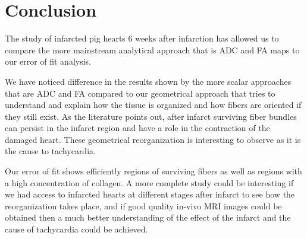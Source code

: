 \chapter{Conclusion}

The study of infarcted pig hearts 6 weeks after infarction has allowed us to compare the more mainstream analytical approach that is ADC and FA maps to our error of fit analysis.

We have noticed difference in the results shown by the more scalar approaches that are ADC and FA compared to our geometrical approach that tries to understand and explain how the tissue is organized and how fibers are oriented if they still exist. As the literature points out, after infarct surviving fiber bundles can persist in the infarct region and have a role in the contraction of the damaged heart. These geometrical reorganization is interesting to observe as it is the cause to tachycardia.

Our error of fit shows efficiently regions of surviving fibers as well as regions with a high concentration of collagen. A more complete study could be interesting if we had access to infarcted hearts at different stages after infarct to see how the reorganization takes place, and if good quality in-vivo MRI images could be obtained then a much better understanding of the effect of the infarct and the cause of tachycardia could be achieved.